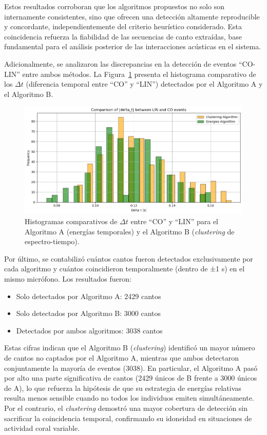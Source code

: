 Estos resultados corroboran que los algoritmos propuestos no 
solo son internamente consistentes, sino que ofrecen una 
detección altamente reproducible y concordante, 
independientemente del criterio heurístico considerado. 
Esta coincidencia refuerza la fiabilidad de las secuencias de 
canto extraídas, base fundamental para el análisis posterior de 
las interacciones acústicas en el sistema.




Adicionalmente, se analizaron las discrepancias en la detección 
de eventos “CO-LIN” entre ambos métodos. La 
Figura~\ref{fig:delta_hist} presenta el histograma comparativo 
de los \(\Delta t\) (diferencia temporal entre “CO” y “LIN”) 
detectados por el Algoritmo A y el Algoritmo B. 

\begin{figure}[ht]
    \centering
    \includegraphics[width=\columnwidth]{Graphics/histogram_energies_clustering.png}
    \caption{Histogramas comparativos de \(\Delta t\) entre “CO” y “LIN” para el Algoritmo A (energías temporales) y el Algoritmo B (\textit{clustering} de espectro-tiempo).}
    \label{fig:delta_hist}
\end{figure}

Por último, se contabilizó cuántos cantos fueron detectados 
exclusivamente por cada algoritmo y cuántos coincidieron 
temporalmente (dentro de ±1 s) en el mismo micrófono. Los 
resultados fueron:
\begin{itemize}
  \item Solo detectados por Algoritmo A: 2429 cantos
  \item Solo detectados por Algoritmo B: 3000 cantos
  \item Detectados por ambos algoritmos: 3038 cantos
\end{itemize}

Estas cifras indican que el Algoritmo B (\textit{clustering}) 
identificó un mayor número de cantos no captados por el 
Algoritmo A, mientras que ambos detectaron conjuntamente la 
mayoría de eventos (3038). En particular, el Algoritmo A pasó 
por alto una parte significativa de cantos (2429 únicos de B 
frente a 3000 únicos de A), lo que refuerza la hipótesis de 
que su estrategia de 
energías relativas resulta menos sensible cuando no todos los 
individuos emiten simultáneamente. Por el contrario, el 
\textit{clustering} demostró una mayor cobertura de detección 
sin sacrificar la coincidencia temporal, confirmando su idoneidad 
en situaciones de actividad coral variable.

